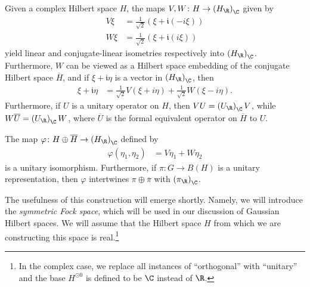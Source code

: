 \documentclass[10pt]{mypackage}
\begin{document}
Given a complex Hilbert space $H$, the maps $V,W\colon H\rightarrow \left( H_{\R} \right)_{\C}$ given by
\begin{align*}
  V\xi &= \frac{1}{\sqrt{2}} \left( \xi + \mathfrak{i}\left( -i\xi \right) \right)\\
  W\xi &= \frac{1}{\sqrt{2}} \left( \xi + \mathfrak{i}\left( i\xi \right) \right)
\end{align*}
yield linear and conjugate-linear isometries respectively into $\left( H_{\R} \right)_{\C}$. Furthermore, $W$ can be viewed as a Hilbert space embedding of the conjugate Hilbert space $ \overline{H} $, and if $\xi + \mathfrak{i}\eta$ is a vector in $\left( H_{\R} \right)_{\C}$, then
\begin{align*}
  \xi + \mathfrak{i}\eta &= \frac{1}{\sqrt{2}} V\left( \xi + i\eta \right) + \frac{1}{\sqrt{2}} W\left( \xi - i\eta \right).
\end{align*}
Furthermore, if $U$ is a unitary operator on $H$, then $VU = \left( U_{\R} \right)_{\C}V$, while $W \overline{U} = \left( U_{\R} \right)_{\C}W$, where $ \overline{U} $ is the formal equivalent operator on $ \overline{H} $ to $U$.
\begin{proposition}
  The map $\varphi\colon H\oplus \overline{H}\rightarrow \left( H_{\R} \right)_{\C}$ defined by
  \begin{align*}
    \varphi\left( \eta_1,\eta_2 \right) &= V\eta_1 + W\eta_2
  \end{align*}
  is a unitary isomorphism. Furthermore, if $\pi\colon G\rightarrow B\left( H \right)$ is a unitary representation, then $\varphi$ intertwines $ \pi \oplus \overline{\pi} $ with $\left( \pi_{\R} \right)_{\C}$.
\end{proposition}
The usefulness of this construction will emerge shortly. Namely, we will introduce the \textit{symmetric Fock space}, which will be used in our discussion of Gaussian Hilbert spaces. We will assume that the Hilbert space $H$ from which we are constructing this space is real.\footnote{In the complex case, we replace all instances of ``orthogonal'' with ``unitary'' and the base $H^{\odot 0}$ is defined to be $\C$ instead of $\R$.}
\end{document}
